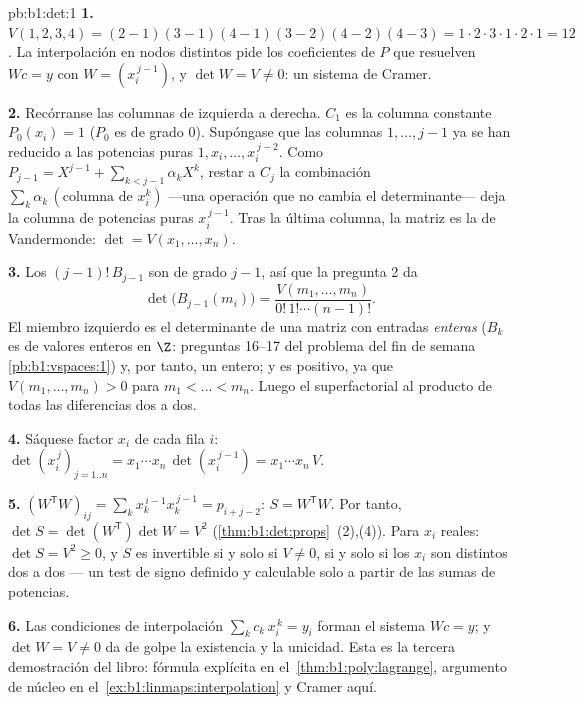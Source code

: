 \begin{solution}{pb:b1:det:1}
\textbf{1.} $V(1,2,3,4) = (2-1)(3-1)(4-1)(3-2)(4-2)(4-3) =
1 \cdot 2\cdot 3\cdot 1\cdot 2\cdot 1 = 12$. La interpolación en
nodos distintos pide los coeficientes de $P$ que resuelven $W c = y$
con $W = (x_i^{\,j-1})$, y $\det W = V \neq 0$: un sistema de Cramer.

\textbf{2.} Recórranse las columnas de izquierda a derecha. $C_1$ es
la columna constante $P_0(x_i) = 1$ ($P_0$ es  de grado $0$).
Supóngase que las columnas $1, \dots, j-1$ ya se han reducido a las
potencias puras $1, x_i, \dots, x_i^{\,j-2}$. Como
$P_{j-1} = X^{j-1} + \sum_{k < j-1}\alpha_k X^k$, restar a $C_j$ la
combinación $\sum_k \alpha_k\,(\text{columna de } x_i^k)$ ---una
operación que no cambia el determinante--- deja la columna de
potencias puras $x_i^{\,j-1}$. Tras la última columna, la matriz es
la de Vandermonde: $\det = V(x_1, \dots, x_n)$.

\textbf{3.} Los  $(j-1)!\,B_{j-1}$ son  de grado
$j - 1$, así que la pregunta 2 da
\[
\det\bigl(B_{j-1}(m_i)\bigr)
= \frac{V(m_1, \dots, m_n)}{0!\,1!\cdots(n-1)!} .
\]
El miembro izquierdo es el determinante de una matriz con entradas
\emph{enteras} ($B_k$ es de valores enteros en $\Z$: preguntas 16--17
del problema del fin de semana \cref{pb:b1:vspaces:1}) y, por tanto,
un entero; y es positivo, ya que $V(m_1, \dots, m_n) > 0$ para
$m_1 < \dots < m_n$. Luego el superfactorial  al producto de
todas las diferencias dos a dos.

\textbf{4.} Sáquese factor $x_i$ de cada fila $i$:
$\det(x_i^{\,j})_{j = 1..n} = x_1\cdots x_n\, \det(x_i^{\,j-1}) =
x_1\cdots x_n\,V$.

\textbf{5.} $(W^{\mathsf T}W)_{ij} = \sum_k x_k^{\,i-1}
x_k^{\,j-1} = p_{i+j-2}$: $S = W^{\mathsf T}W$. Por tanto,
$\det S = \det(W^{\mathsf T})\det W = V^2$
(\cref{thm:b1:det:props}~(2),(4)). Para $x_i$ reales:
$\det S = V^2 \geq 0$, y $S$ es invertible si y solo si $V \neq 0$,
si y solo si los $x_i$ son distintos dos a dos --- un test de signo
definido y calculable solo a partir de las sumas de potencias.

\textbf{6.} Las condiciones de interpolación
$\sum_{k} c_k\,x_i^{\,k} = y_i$ forman el sistema $Wc = y$; y
$\det W = V \neq 0$ da de golpe la existencia y la unicidad. Esta es
la tercera demostración del libro: fórmula explícita en
el~\cref{thm:b1:poly:lagrange}, argumento de núcleo en
el~\cref{ex:b1:linmaps:interpolation} y Cramer aquí.


\end{solution}
